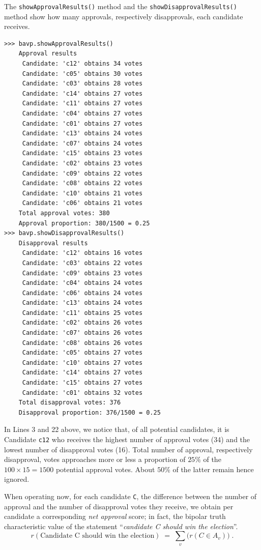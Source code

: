 The \texttt{showApprovalResults()} method and the \texttt{showDisapprovalResults()} method show how many approvals, respectively disapprovals, each candidate receives.
\begin{lstlisting}
>>> bavp.showApprovalResults()
    Approval results
     Candidate: 'c12' obtains 34 votes
     Candidate: 'c05' obtains 30 votes
     Candidate: 'c03' obtains 28 votes
     Candidate: 'c14' obtains 27 votes
     Candidate: 'c11' obtains 27 votes
     Candidate: 'c04' obtains 27 votes
     Candidate: 'c01' obtains 27 votes
     Candidate: 'c13' obtains 24 votes
     Candidate: 'c07' obtains 24 votes
     Candidate: 'c15' obtains 23 votes
     Candidate: 'c02' obtains 23 votes
     Candidate: 'c09' obtains 22 votes
     Candidate: 'c08' obtains 22 votes
     Candidate: 'c10' obtains 21 votes
     Candidate: 'c06' obtains 21 votes
    Total approval votes: 380
    Approval proportion: 380/1500 = 0.25
>>> bavp.showDisapprovalResults()
    Disapproval results
     Candidate: 'c12' obtains 16 votes
     Candidate: 'c03' obtains 22 votes
     Candidate: 'c09' obtains 23 votes
     Candidate: 'c04' obtains 24 votes
     Candidate: 'c06' obtains 24 votes
     Candidate: 'c13' obtains 24 votes
     Candidate: 'c11' obtains 25 votes
     Candidate: 'c02' obtains 26 votes
     Candidate: 'c07' obtains 26 votes
     Candidate: 'c08' obtains 26 votes
     Candidate: 'c05' obtains 27 votes
     Candidate: 'c10' obtains 27 votes
     Candidate: 'c14' obtains 27 votes
     Candidate: 'c15' obtains 27 votes
     Candidate: 'c01' obtains 32 votes
    Total disapproval votes: 376
    Disapproval proportion: 376/1500 = 0.25
\end{lstlisting}

In Lines 3 and 22 above, we notice that, of all potential candidates, it is Candidate \texttt{c12} who receives the highest number of approval votes (34) and the lowest number of disapproval votes (16). Total number of approval, respectively disapproval, votes approaches more or less a proportion of $25\%$ of the $100 \times 15 = 1500$ potential approval votes. About $50\%$ of the latter remain hence ignored. 

When operating now, for each candidate \texttt{C}, the difference between the number of approval and the number of disapproval votes they receive, we obtain per candidate a corresponding \emph{net approval} score; in fact, the bipolar truth characteristic value of the statement ``\emph{candidate C should win the election}''.
\begin{equation}
r(\text{Candidate C should win the election}) \;=\; \sum_v \big(r(C \in A_v)\big)\;.
\end{equation}

